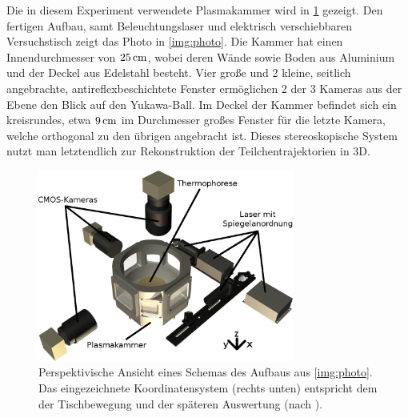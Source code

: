 \documentclass[numbers=noenddot,a4paper]{scrartcl}
\begin{document}
			Die in diesem Experiment verwendete Plasmakammer wird in \ref{img:plasmakammer} gezeigt. Den fertigen Aufbau, samt Beleuchtungslaser und elektrisch verschiebbaren Versuchstisch zeigt das Photo in \ref{img:photo}. Die Kammer hat einen Innendurchmesser von $\unit[25]{cm}$, wobei deren W\"ande sowie Boden aus Aluminium und der Deckel aus Edelstahl besteht. Vier gro{\ss}e und 2 kleine, seitlich angebrachte, antireflexbeschichtete Fenster erm\"oglichen 2 der 3 Kameras aus der Ebene den Blick auf den Yukawa-Ball. Im Deckel der Kammer befindet sich ein kreisrundes, etwa $\unit[9]{cm}$ im Durchmesser gro{\ss}es Fenster f\"ur die letzte Kamera, welche orthogonal zu den \"ubrigen angebracht ist. Dieses stereoskopische System nutzt man letztendlich zur Rekonstruktion der Teilchentrajektorien in 3D.


       			\begin{figure}[t]
       				\centering
       				\includegraphics[width=0.75\textwidth,height=0.55\textwidth]{figs/witharrowsnunu.png}
       				\caption{Perspektivische Ansicht eines Schemas des Aufbaus aus \ref{img:photo}. Das eingezeichnete Koordinatensystem (rechts unten) entspricht dem der Tischbewegung und der späteren Auswertung (nach \cite{Mulsow13}).}
       				\label{img:plasmakammer}
       			\end{figure}
\end{document}
